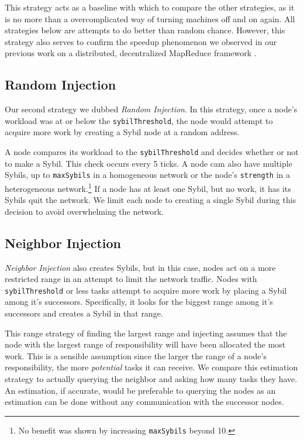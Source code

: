 This strategy acts as a baseline with which to compare the other strategies, as it is no more than a overcomplicated way of turning machines off and on again. 
All strategies below are attempts to do better than random chance.
However, this strategy also serves to confirm the speedup phenomenon we observed in our previous work on a distributed, decentralized MapReduce framework \cite{chordreduce}.

\subsection{Random Injection}
\label{sec:strat-randomInject}
Our second strategy we dubbed \textit{Random Injection}.
In this strategy, once a node's workload was at or below the \texttt{sybilThreshold}, the node would attempt to acquire more work by creating a Sybil node at a random address.

A node compares its workload to the \texttt{sybilThreshold} and decides whether or not to make a Sybil.
This check occurs every 5 ticks.
A node cam also have multiple Sybils, up to \texttt{maxSybils} in a homogeneous network or the node's \texttt{strength} in a heterogeneous network.\footnote{No benefit was shown by increasing \texttt{maxSybils} beyond 10.}
If a node has at least one Sybil, but no work, it has its Sybils quit the network.
We limit each node to creating a single Sybil during this decision to avoid overwhelming the network.




\subsection{Neighbor Injection}
\label{sec:strat-neighbor}
\textit{Neighbor Injection} also creates Sybils, but in this case, nodes act on a more restricted range in an attempt to limit the network traffic.
Nodes with \texttt{sybilThreshold} or less tasks attempt to acquire more work by placing a Sybil among it's successors.
Specifically, it looks for the biggest range among it's successors and creates a Sybil in that range.

This range strategy of finding the largest range and injecting assumes that the node with the largest range of responsibility will have been allocated the most work.
This is a sensible assumption since the larger the range of a node's responsibility, the more \textit{potential} tasks it can receive. 
We compare this estimation strategy to actually querying the neighbor and asking how many tasks they have.
An estimation, if accurate, would be preferable to querying the nodes as an estimation can be done without any communication with the successor nodes.

